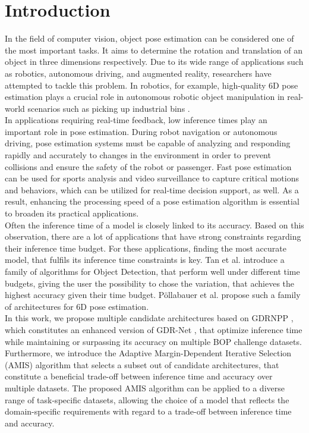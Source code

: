 \section{Introduction}
In the field of computer vision, object pose estimation can be considered one of the most important tasks.
It aims to determine the rotation and translation of an object in three dimensions respectively.
Due to its wide range of applications such as robotics, autonomous driving, and augmented reality, researchers have attempted to tackle this problem.
In robotics, for example, high-quality 6D pose estimation plays a crucial role in autonomous robotic object manipulation in real-world scenarios such as picking up industrial bins \cite{deng2020self,}.\\
In applications requiring real-time feedback, low inference times play an important role in pose estimation. During robot navigation or autonomous driving, pose estimation systems must be capable of analyzing and responding rapidly and accurately to changes in the environment in order to prevent collisions and ensure the safety of the robot or passenger.
Fast pose estimation can be used for sports analysis and video surveillance to capture critical motions and behaviors, which can be utilized for real-time decision support, as well.
As a result, enhancing the processing speed of a pose estimation algorithm is essential to broaden its practical applications.\\
Often the inference time of a model is closely linked to its accuracy.
Based on this observation, there are a lot of applications that have strong constraints regarding their inference time budget.
For these applications, finding the most accurate model, that fulfils its inference time constraints is key.
Tan et al. \cite{tan2020efficientdet} introduce a family of algorithms for Object Detection, that perform well under different time budgets, giving the user the possibility to chose the variation, that achieves the highest accuracy given their time budget.
Pöllabauer et al. \cite{pollabauer2024fast} propose such a family of architectures for 6D pose estimation.\\
In this work, we propose multiple candidate architectures based on GDRNPP \cite{liuShanicelGdrnpp_bop20222024}, which constitutes an enhanced version of GDR-Net \cite{wang2021gdr}, that optimize inference time while maintaining or surpassing its accuracy on multiple BOP challenge \cite{BOPBenchmark6Da} datasets.
Furthermore, we introduce the Adaptive Margin-Dependent Iterative Selection (AMIS) algorithm that selects a subset out of candidate architectures, that constitute a beneficial trade-off between inference time and accuracy over multiple datasets.
The proposed AMIS algorithm can be applied to a diverse range of task-specific datasets, allowing the choice of a model that reflects the domain-specific requirements with regard to a trade-off between inference time and accuracy.

